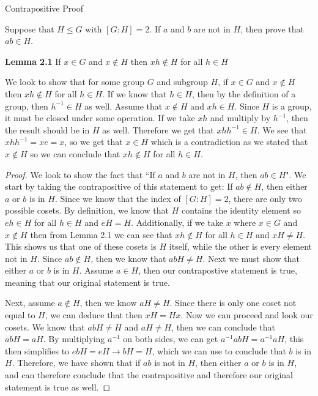 Contrapositive Proof

Suppose that $H\leq G$ with $[G:H]=2$.  If $a$ and $b$ are not in $H$, then prove that $ab\in H$.


\textbf{Lemma 2.1} If $x \in G$ and $x \not \in H$ then $xh \not \in H$ for all $h \in H$

We look to show that for some group $G$ and subgroup $H$, if $x \in G$ and $x \not \in H$ then $xh \not \in H$ for all $h \in H$.
If we know that $h\in H$, then by the definition of a group, then $h^{-1} \in H$ as well. Assume that $x \not \in H$ and $xh \in H$. Since $H$ is a group, it must be closed under some operation. If we take $xh$ and multiply by $h^{-1}$, then the result should be in $H$ as well. Therefore we get that $xhh^{-1} \in H$. We see that $xhh^{-1} = xe = x$, so we get that $x\in H$ which is a contradiction as we stated that $x \not \in H$ so we can conclude that $xh \not \in H$ for all $h \in H$.


\begin{proof}
We look to show the fact that ``If $a$ and $b$ are not in $H$, then $ab\in H$". We start by taking the contrapositive of this statement to get: If $ab \not\in H$, then either $a$ or $b$ is in $H$. Since we know that the index of $[G:H] = 2$, there are only two possible cosets. By definition, we know that $H$ contains the identity element so $eh \in H$ for all $h\in H$ and $eH = H$. Additionally, if we take $x$ where $x\in G$ and $x \not\in H$ then from Lemma 2.1 we can see that $xh \not \in H $  for all $h\in H$ and $xH \neq H$. This shows us that one of these cosets is $H$ itself, while the other is every element not in $H$. Since $ab\not\in H$, then we know that $abH \neq H$. Next we must show that either $a$ or $b$ is in $H$. Assume $a \in H$, then our contrapostive statement is true, meaning that our original statement is true. 

Next, assume $a \not\in H$, then we know $aH \neq H$.  Since there is only one coset not equal to $H$, we can deduce that then $xH = Hx$. Now we can proceed and look our cosets. We know that $abH \neq H$ and $aH \neq H$, then we can conclude that $abH = aH$. By multiplying $a^{-1}$ on both sides, we can get $a^{-1}abH = a^{-1}aH$, this then simplifies to $ebH = eH \rightarrow bH = H$, which we can use to conclude that $b$ is in $H$. Therefore, we have shown that if $ab$ is not in $H$, then either $a$ or $b$ is in $H$, and can therefore conclude that the contrapositive and therefore our original statement is true as well.
\end{proof}
